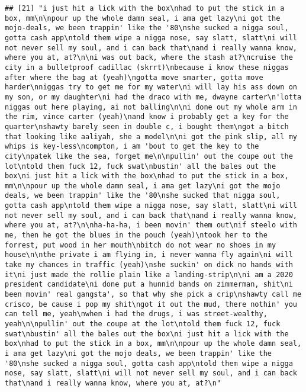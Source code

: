 \documentclass[]{article}
\begin{document}
\begin{verbatim}
## [21] "i just hit a lick with the box\nhad to put the stick in a box, mm\n\npour up the whole damn seal, i ama get lazy\ni got the mojo-deals, we been trappin' like the '80\nshe sucked a nigga soul, gotta cash app\ntold them wipe a nigga nose, say slatt, slatt\ni will not never sell my soul, and i can back that\nand i really wanna know, where you at, at?\n\ni was out back, where the stash at?\ncruise the city in a bulletproof cadillac (skrrt)\nbecause i know these niggas after where the bag at (yeah)\ngotta move smarter, gotta move harder\nniggas try to get me for my water\ni will lay his ass down on my son, or my daughter\ni had the draco with me, dwayne carter\n'lotta niggas out here playing, ai not balling\n\ni done out my whole arm in the rim, vince carter (yeah)\nand know i probably get a key for the quarter\nshawty barely seen in double c, i bought them\ngot a bitch that looking like aaliyah, she a model\n\ni got the pink slip, all my whips is key-less\ncompton, i am 'bout to get the key to the city\npatek like the sea, forget me\n\npullin' out the coupe out the lot\ntold them fuck 12, fuck swat\nbustin' all the bales out the box\ni just hit a lick with the box\nhad to put the stick in a box, mm\n\npour up the whole damn seal, i ama get lazy\ni got the mojo deals, we been trappin' like the '80\nshe sucked that nigga soul, gotta cash app\ntold them wipe a nigga nose, say slatt, slatt\ni will not never sell my soul, and i can back that\nand i really wanna know, where you at, at?\n\nha-ha-ha, i been movin' them out\nif steelo with me, then he got the blues in the pouch (yeah)\ntook her to the forrest, put wood in her mouth\nbitch do not wear no shoes in my house\n\nthe private i am flying in, i never wanna fly again\ni will take my chances in traffic (yeah)\nshe suckin' on dick no hands with it\ni just made the rollie plain like a landing-strip\n\ni am a 2020 president candidate\ni done put a hunnid bands on zimmerman, shit\ni been movin' real gangsta', so that why she pick a crip\nshawty call me crisco, be cause i pop my shit\ngot it out the mud, there nothin' you can tell me, yeah\nwhen i had the drugs, i was street-wealthy, yeah\n\npullin' out the coupe at the lot\ntold them fuck 12, fuck swat\nbustin' all the bales out the box\ni just hit a lick with the box\nhad to put the stick in a box, mm\n\npour up the whole damn seal, i ama get lazy\ni got the mojo deals, we been trappin' like the '80\nshe sucked a nigga soul, gotta cash app\ntold them wipe a nigga nose, say slatt, slatt\ni will not never sell my soul, and i can back that\nand i really wanna know, where you at, at?\n"                                                                                                                                                                                                                                                                                                                                                                                                                                                                                                                                                                                                                                                                                                                  
\end{verbatim}
\end{document}
